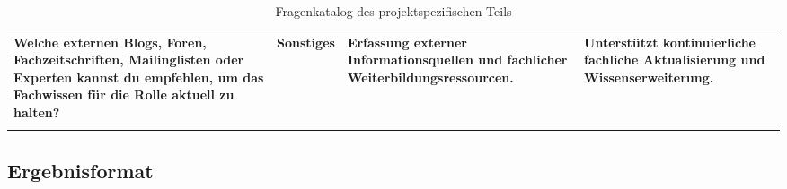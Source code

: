 \documentclass[
  10pt,
  ngerman,
  a4paper,
  toc=graduated,
  numbers=noenddot,
  headings=standardclasses,
  nonumberlist
]{scrartcl}
\begin{document}
\begin{longtable}{|L{4.9cm}|L{3.1cm}|L{3.8cm}|L{3.3cm}|}
Welche externen Blogs, Foren, Fachzeitschriften, Mailinglisten oder Experten kannst du empfehlen, um das Fachwissen für die Rolle aktuell zu halten?
& Sonstiges
& Erfassung externer Informationsquellen und fachlicher Weiterbildungsressourcen.
& Unterstützt kontinuierliche fachliche Aktualisierung und Wissenserweiterung. \\
\hline
\caption{Fragenkatalog des projektspezifischen Teils}
\label{tab:fragenkatalog_teil_2}
\end{longtable}

\clearpage
\subsection{Ergebnisformat}
\label{anhang_ergebnisformat}
\end{document}
